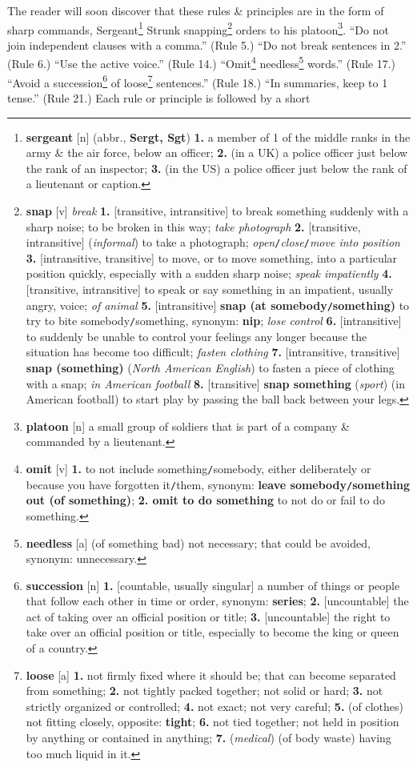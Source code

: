 \documentclass{article}
\begin{document}
The reader will soon discover that these rules \& principles are in the form of sharp commands, Sergeant\footnote{{\bf sergeant} [n] (abbr., {\bf Sergt, Sgt}) {\bf 1.} a member of 1 of the middle ranks in the army \& the air force, below an officer; {\bf 2.} (in a UK) a police officer just below the rank of an inspector; {\bf 3.} (in the US) a police officer just below the rank of a lieutenant or caption.} Strunk snapping\footnote{{\bf snap} [v] {\it break} {\bf 1.} [transitive, intransitive] to break something suddenly with a sharp noise; to be broken in this way; {\it take photograph} {\bf 2.} [transitive, intransitive] ({\it informal}) to take a photograph; {\it open}{\tt/}{\it close}{\tt/}{\it move into position} {\bf 3.} [intransitive, transitive] to move, or to move something, into a particular position quickly, especially with a sudden sharp noise; {\it speak impatiently} {\bf 4.} [transitive, intransitive] to speak or say something in an impatient, usually angry, voice; {\it of animal} {\bf 5.} [intransitive] {\bf snap (at somebody{\tt/}something)} to try to bite somebody{\tt/}something, {\sc synonym}: {\bf nip}; {\it lose control} {\bf 6.} [intransitive] to suddenly be unable to control your feelings any longer because the situation has become too difficult; {\it fasten clothing} {\bf 7.} [intransitive, transitive] {\bf snap (something)} ({\it North American English}) to fasten a piece of clothing with a snap; {\it in American football} {\bf 8.} [transitive] {\bf snap something} ({\it sport}) (in American football) to start play by passing the ball back between your legs.} orders to his platoon\footnote{{\bf platoon} [n] a small group of soldiers that is part of a company \& commanded by a lieutenant.}. ``Do not join independent clauses with a comma.'' (Rule 5.) ``Do not break sentences in 2.'' (Rule 6.) ``Use the active voice.'' (Rule 14.) ``Omit\footnote{{\bf omit} [v] {\bf 1.} to not include something{\tt/}somebody, either deliberately or because you have forgotten it{\tt/}them, {\sc synonym}: {\bf leave somebody{\tt/}something out (of something)}; {\bf 2. omit to do something} to not do or fail to do something.} needless\footnote{{\bf needless} [a] (of something bad) not necessary; that could be avoided, {\sc synonym}: unnecessary.} words.'' (Rule 17.) ``Avoid a succession\footnote{{\bf succession} [n] {\bf 1.} [countable, usually singular] a number of things or people that follow each other in time or order, {\sc synonym}: {\bf series}; {\bf 2.} [uncountable] the act of taking over an official position or title; {\bf 3.} [uncountable] the right to take over an official position or title, especially to become the king or queen of a country.} of loose\footnote{{\bf loose} [a] {\bf 1.} not firmly fixed where it should be; that can become separated from something; {\bf 2.} not tightly packed together; not solid or hard; {\bf 3.} not strictly organized or controlled; {\bf 4.} not exact; not very careful; {\bf 5.} (of clothes) not fitting closely, {\sc opposite}: {\bf tight}; {\bf 6.} not tied together; not held in position by anything or contained in anything; {\bf 7.} ({\it medical}) (of body waste) having too much liquid in it.} sentences.'' (Rule 18.) ``In summaries, keep to 1 tense.'' (Rule 21.) Each rule or principle is followed by a short 
\end{document}
